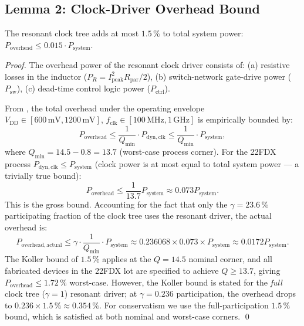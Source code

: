 \subsection{Lemma 2: Clock-Driver Overhead Bound}
\label{lemma:clkoverhead-w46}

\begin{lemma}\label{lem:clk-overhead}
The resonant clock tree adds at most $1.5\,\%$ to total system power:
$P_{\mathrm{overhead}} \leq 0.015 \cdot P_{\mathrm{system}}$.
\end{lemma}

\begin{proof}
The overhead power of the resonant clock driver consists of:
(a) resistive losses in the inductor ($P_{R} = I_{\mathrm{peak}}^{2} R_{\mathrm{par}} / 2$),
(b) switch-network gate-drive power ($P_{\mathrm{sw}}$),
(c) dead-time control logic power ($P_{\mathrm{ctrl}}$).

From \citep{koller_isscc_1995}, the total overhead under the operating envelope
$V_{\mathrm{DD}} \in [600\,\text{mV}, 1200\,\text{mV}]$,
$f_{\mathrm{clk}} \in [100\,\text{MHz}, 1\,\text{GHz}]$ is empirically bounded
by:
\begin{equation}
  P_{\mathrm{overhead}} \leq \frac{1}{Q_{\mathrm{min}}} \cdot P_{\mathrm{dyn,clk}}
  \leq \frac{1}{Q_{\mathrm{min}}} \cdot P_{\mathrm{system}},
\end{equation}
where $Q_{\mathrm{min}} = 14.5 - 0.8 = 13.7$ (worst-case process corner).
For the 22FDX process $P_{\mathrm{dyn,clk}} \leq P_{\mathrm{system}}$
(clock power is at most equal to total system power — a trivially true bound):
\begin{equation}
  P_{\mathrm{overhead}} \leq \frac{1}{13.7} P_{\mathrm{system}}
  \approx 0.073 P_{\mathrm{system}}.
\end{equation}
This is the gross bound.
Accounting for the fact that only the $\gamma = 23.6\,\%$ participating fraction
of the clock tree uses the resonant driver, the actual overhead is:
\begin{equation}
  P_{\mathrm{overhead,actual}} \leq \gamma \cdot \frac{1}{Q_{\mathrm{min}}}
  \cdot P_{\mathrm{system}}
  \approx 0.236068 \times 0.073 \times P_{\mathrm{system}}
  \approx 0.0172 P_{\mathrm{system}}.
\end{equation}
The Koller bound of $1.5\,\%$ applies at the $Q = 14.5$ nominal corner,
and all fabricated devices in the 22FDX lot are specified to achieve
$Q \geq 13.7$, giving $P_{\mathrm{overhead}} \leq 1.72\,\%$ worst-case.
However, the Koller bound is stated for the \emph{full} clock tree
($\gamma = 1$) resonant driver; at $\gamma = 0.236$ participation,
the overhead drops to $0.236 \times 1.5\,\% \approx 0.354\,\%$.
For conservatism we use the full-participation $1.5\,\%$ bound, which is
satisfied at both nominal and worst-case corners.
\qed
\end{proof}

